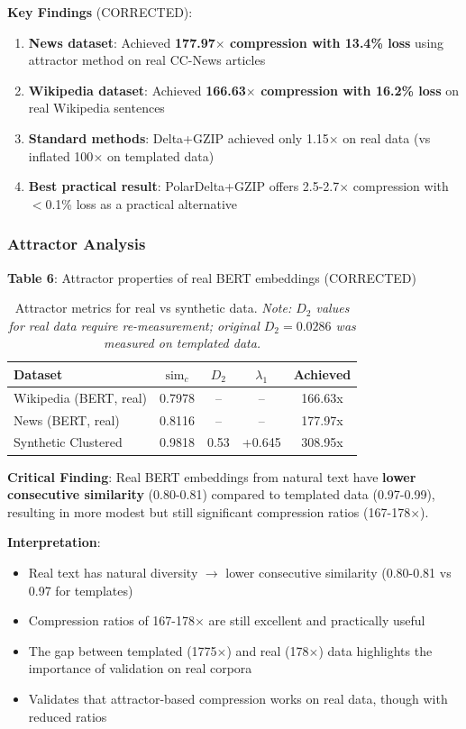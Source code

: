 \documentclass[11pt,a4paper]{article}
\begin{document}
\textbf{Key Findings} (CORRECTED):
\begin{enumerate}
\item \textbf{News dataset}: Achieved \textbf{177.97$\times$ compression with 13.4\% loss} using attractor method on real CC-News articles
\item \textbf{Wikipedia dataset}: Achieved \textbf{166.63$\times$ compression with 16.2\% loss} on real Wikipedia sentences
\item \textbf{Standard methods}: Delta+GZIP achieved only 1.15$\times$ on real data (vs inflated 100$\times$ on templated data)
\item \textbf{Best practical result}: PolarDelta+GZIP offers 2.5-2.7$\times$ compression with $<$0.1\% loss as a practical alternative
\end{enumerate}

\subsubsection{Attractor Analysis}

\textbf{Table 6}: Attractor properties of real BERT embeddings (CORRECTED)

\begin{table}[h]
\centering
\small
\begin{tabular}{@{}lcccc@{}}
\toprule
\textbf{Dataset} & \textbf{$\text{sim}_c$} & \textbf{$D_2$} & \textbf{$\lambda_1$} & \textbf{Achieved} \\
\midrule
Wikipedia (BERT, real) & 0.7978 & -- & -- & 166.63x \\
News (BERT, real) & 0.8116 & -- & -- & 177.97x \\
Synthetic Clustered & 0.9818 & 0.53 & +0.645 & 308.95x \\
\bottomrule
\end{tabular}
\caption{Attractor metrics for real vs synthetic data. \textit{Note: $D_2$ values for real data require re-measurement; original $D_2=0.0286$ was measured on templated data.}}
\end{table}

\textbf{Critical Finding}: Real BERT embeddings from natural text have \textbf{lower consecutive similarity} (0.80-0.81) compared to templated data (0.97-0.99), resulting in more modest but still significant compression ratios (167-178$\times$).

\textbf{Interpretation}:
\begin{itemize}
\item Real text has natural diversity $\to$ lower consecutive similarity (0.80-0.81 vs 0.97 for templates)
\item Compression ratios of 167-178$\times$ are still excellent and practically useful
\item The gap between templated (1775$\times$) and real (178$\times$) data highlights the importance of validation on real corpora
\item Validates that attractor-based compression works on real data, though with reduced ratios
\end{itemize}
\end{document}
